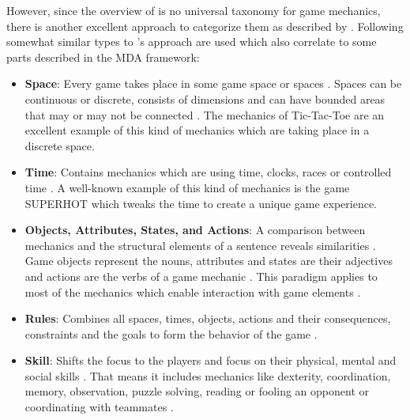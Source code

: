 \documentclass[MGS,Master,english]{twbook}%
\begin{document}
However, since the overview of \citep{gameDesign::gameMechanicsAdvancedGameDesign} is no universal taxonomy for game mechanics, there is another excellent approach to categorize them as described by \citep{gameDesign::bookOfLenses}. Following somewhat similar types to 's approach are used which also correlate to some parts described in the \ac{MDA} framework:
\begin{itemize}
	\item \textbf{Space}: Every game takes place in some game space or spaces \cite{gameDesign::bookOfLenses}. Spaces can be continuous or discrete, consists of dimensions and can have bounded areas that may or may not be connected \cite{gameDesign::bookOfLenses}. The mechanics of Tic-Tac-Toe are an excellent example of this kind of mechanics which are taking place in a discrete space. 
	\item \textbf{Time}: Contains mechanics which are using time, clocks, races or controlled time \cite{gameDesign::bookOfLenses}. A well-known example of this kind of mechanics is the game SUPERHOT \cite{game::superhot} which tweaks the time to create a unique game experience.
	\item \textbf{Objects, Attributes, States, and Actions}: A comparison between mechanics and the structural elements of a sentence reveals similarities \cite{gameDesign::bookOfLenses}. Game objects represent the nouns, attributes and states are their adjectives and actions are the verbs of a game mechanic \cite{gameDesign::bookOfLenses}. This paradigm applies to most of the mechanics which enable interaction with game elements \cite{gameDesign::bookOfLenses}. 
	\item \textbf{Rules}: Combines all spaces, times, objects, actions and their consequences, constraints and the goals to form the behavior of the game \cite{gameDesign::bookOfLenses}. 
	\item \textbf{Skill}: Shifts the focus to the players and focus on their physical, mental and social skills \cite{gameDesign::bookOfLenses}. That means it includes mechanics like dexterity, coordination, memory, observation, puzzle solving, reading or fooling an opponent or coordinating with teammates \cite{gameDesign::bookOfLenses}.  
\end{itemize}

\end{document}
